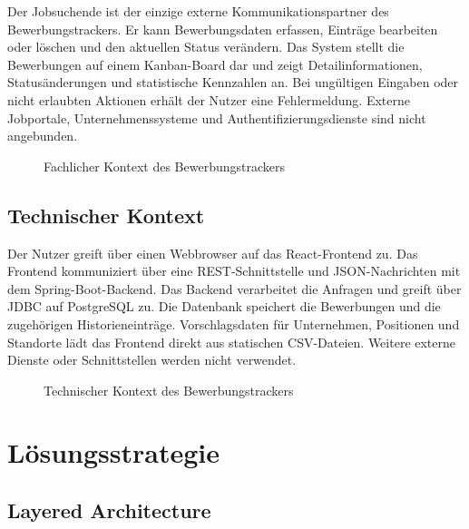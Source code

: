 \documentclass[a4paper,11pt]{article}
\begin{document}
Der Jobsuchende ist der einzige externe Kommunikationspartner des Bewerbungstrackers.
Er kann Bewerbungsdaten erfassen, Einträge bearbeiten oder löschen und den aktuellen Status verändern.
Das System stellt die Bewerbungen auf einem Kanban-Board dar und zeigt Detailinformationen, Statusänderungen und statistische Kennzahlen an.
Bei ungültigen Eingaben oder nicht erlaubten Aktionen erhält der Nutzer eine Fehlermeldung.
Externe Jobportale, Unternehmenssysteme und Authentifizierungsdienste sind nicht angebunden.

\vspace{0.5cm}
\begin{figure}[H]
\centering

\caption{Fachlicher Kontext des Bewerbungstrackers}
\label{fig:functional-context}
\end{figure}

\subsection{Technischer Kontext}

Der Nutzer greift über einen Webbrowser auf das React-Frontend zu.
Das Frontend kommuniziert über eine REST-Schnittstelle und JSON-Nachrichten mit dem Spring-Boot-Backend.
Das Backend verarbeitet die Anfragen und greift über JDBC auf PostgreSQL zu.
Die Datenbank speichert die Bewerbungen und die zugehörigen Historieneinträge.
Vorschlagsdaten für Unternehmen, Positionen und Standorte lädt das Frontend direkt aus statischen CSV-Dateien.
Weitere externe Dienste oder Schnittstellen werden nicht verwendet.

\vspace{0.5cm}
\begin{figure}[H]
\centering

\caption{Technischer Kontext des Bewerbungstrackers}
\label{fig:technical-context}
\end{figure}






\section{Lösungsstrategie}
\label{sec:solution-strategy}


\subsection{Layered Architecture}
\end{document}
